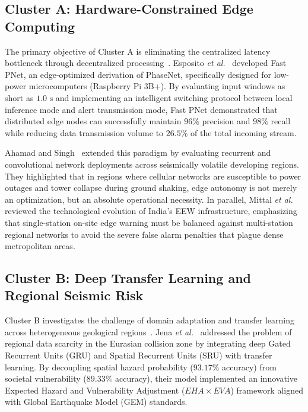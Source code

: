\documentclass[journal]{IEEEtran}
\begin{document}
\subsection{Cluster A: Hardware-Constrained Edge Computing}
The primary objective of Cluster A is eliminating the centralized latency bottleneck through decentralized processing~\cite{esposito2025aiot, ahamad2025deep}. Esposito \textit{et al.}~\cite{esposito2025aiot} developed Fast PNet, an edge-optimized derivation of PhaseNet, specifically designed for low-power microcomputers (Raspberry Pi 3B+). By evaluating input windows as short as $1.0\text{ s}$ and implementing an intelligent switching protocol between local inference mode and alert transmission mode, Fast PNet demonstrated that distributed edge nodes can successfully maintain $96\%$ precision and $98\%$ recall while reducing data transmission volume to $26.5\%$ of the total incoming stream.

Ahamad and Singh~\cite{ahamad2025deep} extended this paradigm by evaluating recurrent and convolutional network deployments across seismically volatile developing regions. They highlighted that in regions where cellular networks are susceptible to power outages and tower collapse during ground shaking, edge autonomy is not merely an optimization, but an absolute operational necessity. In parallel, Mittal \textit{et al.}~\cite{mittal2025india} reviewed the technological evolution of India's EEW infrastructure, emphasizing that single-station on-site edge warning must be balanced against multi-station regional networks to avoid the severe false alarm penalties that plague dense metropolitan areas.

\subsection{Cluster B: Deep Transfer Learning and Regional Seismic Risk}
Cluster B investigates the challenge of domain adaptation and transfer learning across heterogeneous geological regions~\cite{jena2023integration, silvalopez2022deep, xie2024deep}. Jena \textit{et al.}~\cite{jena2023integration} addressed the problem of regional data scarcity in the Eurasian collision zone by integrating deep Gated Recurrent Units (GRU) and Spatial Recurrent Units (SRU) with transfer learning. By decoupling spatial hazard probability ($93.17\%$ accuracy) from societal vulnerability ($89.33\%$ accuracy), their model implemented an innovative Expected Hazard and Vulnerability Adjustment ($EHA \times EVA$) framework aligned with Global Earthquake Model (GEM) standards.
\end{document}
